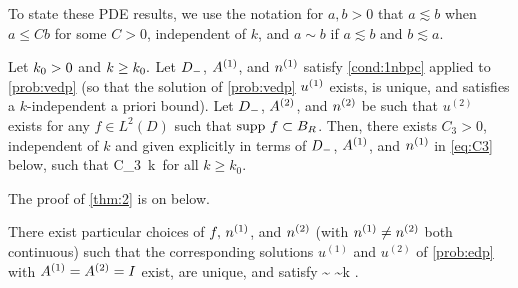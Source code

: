 To state these PDE results, we use the notation for $a,b>0$ that $a\lesssim b$ when $a\leq C b$ for some $C>0$, independent of $k$, and $a\sim b$ if $a\lesssim b$ and $b\lesssim a$.



\begin{theorem}\label{thm:2}
Let $k_{0} > 0$ and $k \geq k_{0}.$ Let $D_{-}$, ${A}^{(1)}$, and ${n}^{(1)}$ satisfy \cref{cond:1nbpc} applied to \cref{prob:vedp} (so that the solution of \cref{prob:vedp} ${u}^{(1)}$ exists, is unique, and satisfies a $k$-independent a priori bound). Let $D_{-}$, ${A}^{(2)}$, and ${n}^{(2)}$ be such that $u^{(2)}$ exists
for any $f\in L^2(D)$ such that $\operatorname{supp} \, f \subset B_{R}$. 
Then, there exists $C_3>0$, independent of $k$ and given explicitly in terms of $D_{-}$, ${A}^{(1)}$, and ${n}^{(1)}$ in \cref{eq:C3} below, such that
\beq\label{eq:PDEbound}
\leq C_3 \,k\, \max\set{\NLiDop{\Aso-\Ast}\,,\, \NLiDRR{\nso-\nst}}
\eeq
for all $k\geq k_0$. 
\end{theorem}

The proof of \cref{thm:2} is on  below.

\ble[Sharpness of the bound \cref{eq:PDEbound} when $\Aso = \Ast= I$]\label{lem:sharp}
There exist particular choices of  $f, \,{n}^{(1)}$, and ${n}^{(2)}$ (with ${n}^{(1)}\neq {n}^{(2)}$ both continuous) such that 
the corresponding solutions $u^{(1)}$ and $u^{(2)}$ of \cref{prob:edp} with $\Aso = \Ast= I$ exist, are unique, and satisfy
\beq\label{eq:sharp1}
\sim 
{}\sim k \NLiDRR{\nso-\nst}.
\eeq
\ele

